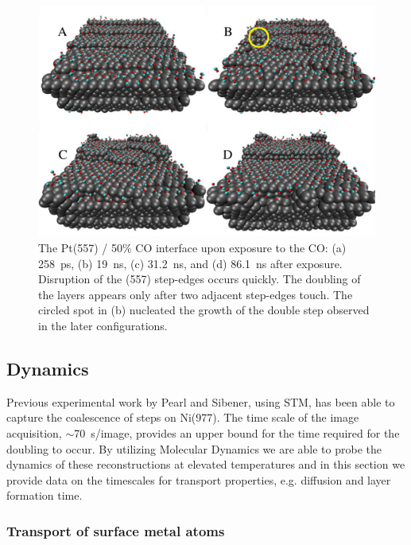 \begin{figure}[p!]
\includegraphics[width=\linewidth]{../figures/chap2/doubleLayer.pdf}
\caption{The Pt(557) / 50\% CO interface upon exposure to the CO: (a)
  258~ps, (b) 19~ns, (c) 31.2~ns, and (d) 86.1~ns after
  exposure. Disruption of the (557) step-edges occurs quickly.  The
  doubling of the layers appears only after two adjacent step-edges
  touch.  The circled spot in (b) nucleated the growth of the double
  step observed in the later configurations.}
  \label{fig:reconstruct}
\end{figure}

\subsection{Dynamics}
Previous experimental work by Pearl and Sibener\citep{Pearl:2001ca}, using
STM, has been able to capture the coalescence of steps on Ni(977). The
time scale of the image acquisition, $\sim$70~s/image, provides an
upper bound for the time required for the doubling to occur. By
utilizing Molecular Dynamics we are able to probe the dynamics of
these reconstructions at elevated temperatures and in this section we
provide data on the timescales for transport properties,
e.g. diffusion and layer formation time.


\subsubsection{Transport of surface metal atoms}

